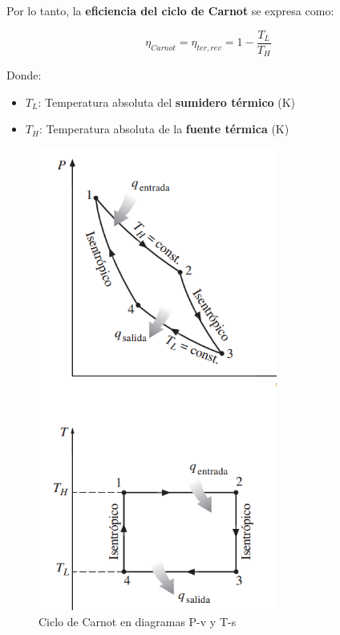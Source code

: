 \documentclass{article}
\begin{document}
    Por lo tanto, la \textbf{eficiencia del ciclo de Carnot} se expresa como:

    \begin{equation}
    \eta_{Carnot} = \eta_{ter,rev} = 1 - \frac{T_L}{T_H}
    \end{equation}

    Donde:
    \begin{itemize}
        \item $T_L$: Temperatura absoluta del \textbf{sumidero térmico} (K)
        \item $T_H$: Temperatura absoluta de la \textbf{fuente térmica} (K)
    \end{itemize}

    \begin{figure}[H]
        \centering
        \includegraphics[width=0.7\textwidth]{Pasted_image_20250803092250.png}
        \caption{Ciclo de Carnot en diagramas P-v y T-s}
        \label{fig:carnot}
    \end{figure}
\end{document}
